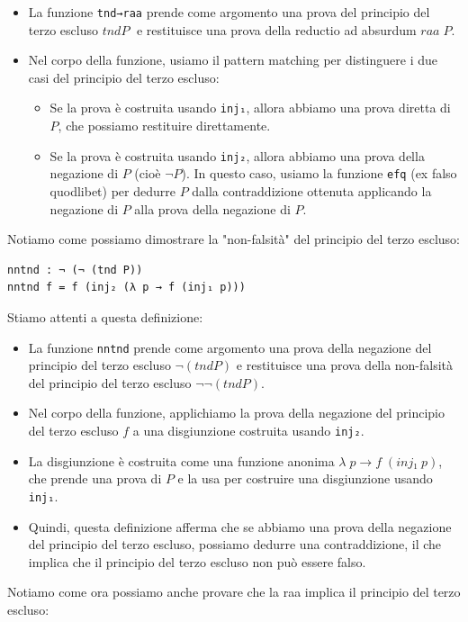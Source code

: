 \documentclass[a4paper]{article}
\theoremstyle{definition}
\theoremstyle{remark}
\begin{document}
\begin{itemize}
  \item La funzione \texttt{tnd→raa} prende come argomento una prova del principio del terzo escluso \( tnd P \; \) e restituisce una prova della reductio ad absurdum \( raa \; P \).
  \item Nel corpo della funzione, usiamo il pattern matching per distinguere i due casi del principio del terzo escluso:
    \begin{itemize}
      \item Se la prova è costruita usando \texttt{inj₁}, allora abbiamo una prova diretta di \( P \), che possiamo restituire direttamente.
      \item Se la prova è costruita usando \texttt{inj₂}, allora abbiamo una prova della negazione di \( P \) (cioè \( \neg P \)). In questo caso, usiamo la funzione \texttt{efq} (ex falso quodlibet) per dedurre \( P \) dalla contraddizione ottenuta applicando la negazione di \( P \) alla prova della negazione di \( P \).
    \end{itemize}
\end{itemize}
Notiamo come possiamo dimostrare la "non-falsità" del principio del terzo escluso:
\begin{verbatim}
nntnd : ¬ (¬ (tnd P))
nntnd f = f (inj₂ (λ p → f (inj₁ p)))
\end{verbatim}
Stiamo attenti a questa definizione:
\begin{itemize}
  \item La funzione \texttt{nntnd} prende come argomento una prova della negazione del principio del terzo escluso \( \neg (tnd P) \) e restituisce una prova della non-falsità del principio del terzo escluso \( \neg \neg (tnd P) \).
  \item Nel corpo della funzione, applichiamo la prova della negazione del principio del terzo escluso \( f \) a una disgiunzione costruita usando \texttt{inj₂}.
  \item La disgiunzione è costruita come una funzione anonima \( λ \; p → f \; (inj₁\; p) \), che prende una prova di \( P \) e la usa per costruire una disgiunzione usando \texttt{inj₁}.
  \item Quindi, questa definizione afferma che se abbiamo una prova della negazione del principio del terzo escluso, possiamo dedurre una contraddizione, il che implica che il principio del terzo escluso non può essere falso.
\end{itemize}
Notiamo come ora possiamo anche provare che la raa implica il principio del terzo escluso:
\end{document}
